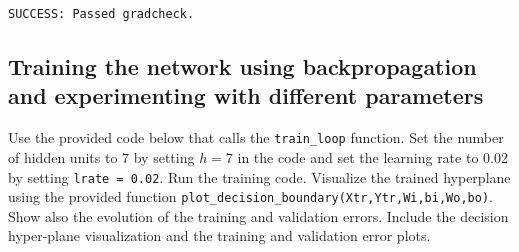 \documentclass[11pt]{article}
\begin{document}
    \begin{Verbatim}[commandchars=\\\{\}]
SUCCESS: Passed gradcheck.

    \end{Verbatim}

    \hypertarget{training-the-network-using-backpropagation-and-experimenting-with-different-parameters}{%
\subsection{Training the network using backpropagation and experimenting
with different
parameters}\label{training-the-network-using-backpropagation-and-experimenting-with-different-parameters}}

    Use the provided code below that calls the \texttt{train\_loop}
function. Set the number of hidden units to 7 by setting \(h=7\) in the
code and set the learning rate to 0.02 by setting
\texttt{lrate\ =\ 0.02}. Run the training code. Visualize the trained
hyperplane using the provided function
\texttt{plot\_decision\_boundary(Xtr,Ytr,Wi,bi,Wo,bo)}. Show also the
evolution of the training and validation errors. Include the decision
hyper-plane visualization and the training and validation error plots.
\end{document}

